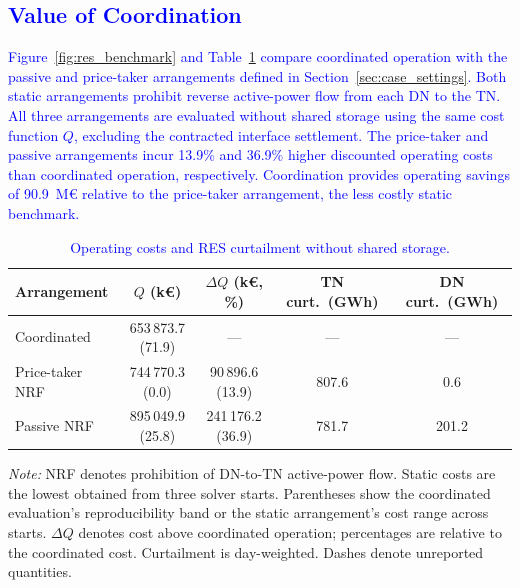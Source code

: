 \documentclass[preprint,12pt]{elsarticle}
\begin{document}
\subsection{\textcolor{blue}{Value of Coordination}}
\label{subsec:res_coordination}

\textcolor{blue}{
    Figure~\ref{fig:res_benchmark} and Table~\ref{tab:res_benchmark} compare coordinated operation with the passive and price-taker arrangements defined in Section~\ref{sec:case_settings}. Both static arrangements prohibit reverse active-power flow from each DN to the TN. 
    All three arrangements are evaluated without shared storage using the same cost function $Q$, excluding the contracted interface settlement.
    The price-taker and passive arrangements incur 13.9\% and 36.9\% higher discounted operating costs than coordinated operation, respectively.
    Coordination provides operating savings of 90.9~M\euro{} relative to the price-taker arrangement, the less costly static benchmark.
}

\begin{table}[htbp!]
    \centering
    \caption{\textcolor{blue}{Operating costs and RES curtailment without shared storage.}}
    \label{tab:res_benchmark}
    \footnotesize\setlength{\tabcolsep}{3pt}
    \begin{tabular}{l c c c c}
        \toprule
        Arrangement & $Q$ (k\euro) & $\Delta Q$ (k\euro, \%) & TN curt.\ (GWh) & DN curt.\ (GWh) \\
        \midrule
        Coordinated     & 653\,873.7 (71.9) & ---                & ---   & ---   \\
        Price-taker NRF & 744\,770.3 (0.0)  & 90\,896.6 (13.9)   & 807.6 & 0.6   \\
        Passive NRF     & 895\,049.9 (25.8) & 241\,176.2 (36.9)  & 781.7 & 201.2 \\
        \bottomrule
    \end{tabular}
    \par\smallskip
    \begin{minipage}{\linewidth}
        \footnotesize\raggedright
        \textit{Note:}
        NRF denotes prohibition of DN-to-TN active-power flow.
        Static costs are the lowest obtained from three solver starts.
        Parentheses show the coordinated evaluation's reproducibility band or the static arrangement's cost range across starts.
        $\Delta Q$ denotes cost above coordinated operation; percentages are relative to the coordinated cost.
        Curtailment is day-weighted. Dashes denote unreported quantities.
    \end{minipage}
\end{table}
\end{document}
